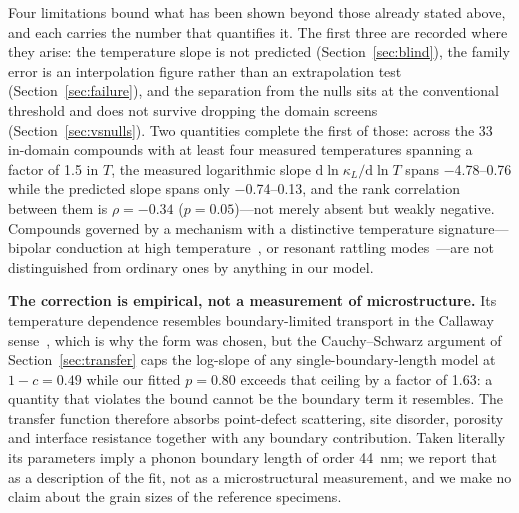 Four limitations bound what has been shown beyond those already stated above, and each carries the
number that quantifies it. The first three are recorded where they arise: the temperature slope is
not predicted (Section~\ref{sec:blind}), the family error is an interpolation figure rather than an
extrapolation test (Section~\ref{sec:failure}), and the separation from the nulls sits at the
conventional threshold and does not survive dropping the domain screens
(Section~\ref{sec:vsnulls}). Two quantities complete the first of those: across the \num{33}
in-domain compounds with at least four measured temperatures spanning a factor of \num{1.5} in $T$,
the measured logarithmic slope $\mathrm{d}\ln\kappa_L/\mathrm{d}\ln T$ spans \numrange{-4.78}{0.76}
while the predicted slope spans only \numrange{-0.74}{0.13}, and the rank correlation between them
is $\rho=-\num{0.34}$ ($p=\num{0.05}$)---not merely absent but weakly negative. Compounds governed
by a mechanism with a distinctive temperature signature---bipolar conduction at high
temperature~\cite{li2015synthesis}, or resonant rattling modes~\cite{jana2016the}---are not
distinguished from ordinary ones by anything in our model.

\textbf{The correction is empirical, not a measurement of microstructure.} Its temperature
dependence resembles boundary-limited transport in the Callaway sense~\cite{callaway1959model},
which is why the form was chosen, but the Cauchy--Schwarz argument of
Section~\ref{sec:transfer} caps the log-slope of any single-boundary-length model at $1-c=\num{0.49}$
while our fitted $p=\num{0.80}$ exceeds that ceiling by a factor of \num{1.63}: a quantity that
violates the bound cannot be the boundary term it resembles. The transfer function therefore
absorbs point-defect scattering, site disorder, porosity and interface resistance together with any
boundary contribution. Taken literally its parameters imply a phonon boundary length of order
\SI{44}{\nano\meter}; we report that as a description of the fit, not as a microstructural
measurement, and we make no claim about the grain sizes of the reference specimens.

